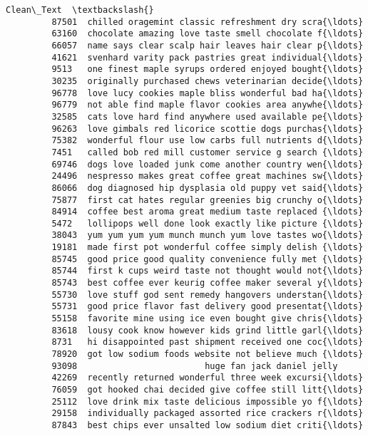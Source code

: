 \documentclass[11pt]{article}
\begin{document}
\begin{Verbatim}[commandchars=\\\{\}]
                                                       Clean\_Text  \textbackslash{}
         87501  chilled oragemint classic refreshment dry scra{\ldots}   
         63160  chocolate amazing love taste smell chocolate f{\ldots}   
         66057  name says clear scalp hair leaves hair clear p{\ldots}   
         41621  svenhard varity pack pastries great individual{\ldots}   
         9513   one finest maple syrups ordered enjoyed bought{\ldots}   
         30235  originally purchased chews veterinarian decide{\ldots}   
         96778  love lucy cookies maple bliss wonderful bad ha{\ldots}   
         96779  not able find maple flavor cookies area anywhe{\ldots}   
         32585  cats love hard find anywhere used available pe{\ldots}   
         96263  love gimbals red licorice scottie dogs purchas{\ldots}   
         75382  wonderful flour use low carbs full nutrients d{\ldots}   
         7451   called bob red mill customer service g search {\ldots}   
         69746  dogs love loaded junk come another country wen{\ldots}   
         24496  nespresso makes great coffee great machines sw{\ldots}   
         86066  dog diagnosed hip dysplasia old puppy vet said{\ldots}   
         75877  first cat hates regular greenies big crunchy o{\ldots}   
         84914  coffee best aroma great medium taste replaced {\ldots}   
         5472   lollipops well done look exactly like picture {\ldots}   
         38043  yum yum yum yum munch munch yum love tastes wo{\ldots}   
         19181  made first pot wonderful coffee simply delish {\ldots}   
         85745  good price good quality convenience fully met {\ldots}   
         85744  first k cups weird taste not thought would not{\ldots}   
         85743  best coffee ever keurig coffee maker several y{\ldots}   
         55730  love stuff god sent remedy hangovers understan{\ldots}   
         55731  good price flavor fast delivery good presentat{\ldots}   
         55158  favorite mine using ice even bought give chris{\ldots}   
         83618  lousy cook know however kids grind little garl{\ldots}   
         8731   hi disappointed past shipment received one coc{\ldots}   
         78920  got low sodium foods website not believe much {\ldots}   
         93098                         huge fan jack daniel jelly   
         42269  recently returned wonderful three week excursi{\ldots}   
         76059  got hooked chai decided give coffee still litt{\ldots}   
         25112  love drink mix taste delicious impossible yo f{\ldots}   
         29158  individually packaged assorted rice crackers r{\ldots}   
         87843  best chips ever unsalted low sodium diet criti{\ldots}   

\end{Verbatim}
\end{document}

